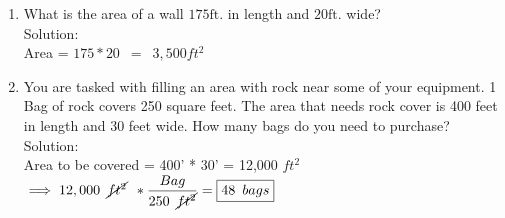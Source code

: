 \begin{enumerate}
\item  What is the area of a wall $175 \mathrm{ft}$. in length and $20 \mathrm{ft}$. wide?\\
\vspace{0.2cm}
Solution:\\
\vspace{0.2cm}
Area = $175 * 20 \enspace = \enspace \boxed{3,500 ft^2}$
\vspace{0.2cm}
\item  You are tasked with filling an area with rock near some of your equipment. 1 Bag of rock covers 250 square feet. The area that needs rock cover is 400 feet in length and 30 feet wide. How many bags do you need to purchase?\\

\vspace{0.2cm}
Solution:\\
\vspace{0.2cm}
Area to be covered = 400' * 30' = 12,000 $ft^2$
\vspace{0.2cm}
$\implies 12,000 \enspace \cancel{ft^2} \enspace * \dfrac{Bag}{250 \enspace \cancel{ft^2}}=\boxed{48 \enspace bags}$


\end{enumerate}

